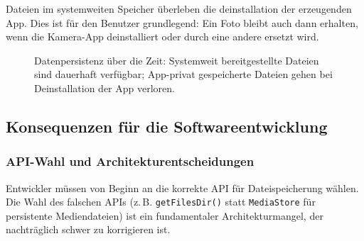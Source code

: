 ﻿\documentclass[12pt, a4paper]{article}
\begin{document}
Dateien im systemweiten Speicher überleben die deinstallation der erzeugenden App.
Dies ist für den Benutzer grundlegend: Ein Foto bleibt auch dann erhalten, wenn
die Kamera-App deinstalliert oder durch eine andere ersetzt wird.

\begin{figure}[ht]
\centering
{}
\caption{Datenpersistenz über die Zeit: Systemweit bereitgestellte Dateien sind dauerhaft
verfügbar; App-privat gespeicherte Dateien gehen bei Deinstallation der App verloren.}
\label{fig:persistenz}
\end{figure}

\subsection{Konsequenzen für die Softwareentwicklung}

\subsubsection{API-Wahl und Architekturentscheidungen}

Entwickler müssen von Beginn an die korrekte API für Dateispeicherung wählen.
Die Wahl des falschen APIs (z.\,B. \texttt{getFilesDir()} statt \texttt{MediaStore}
für persistente Mediendateien) ist ein fundamentaler Architekturmangel, der
nachträglich schwer zu korrigieren ist.
\end{document}
